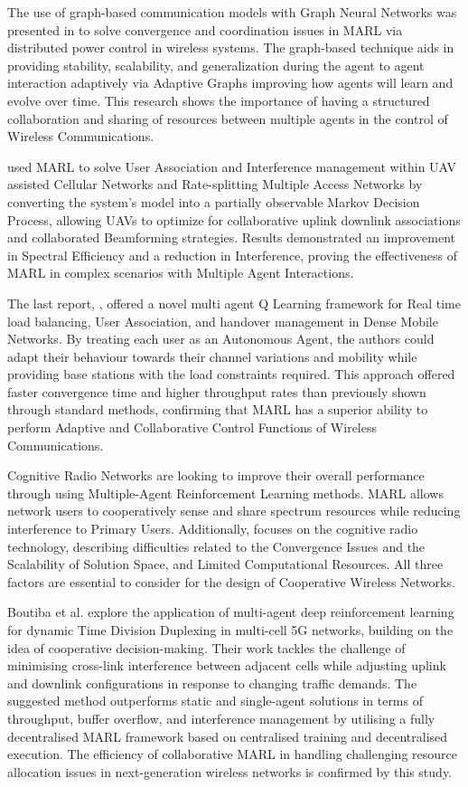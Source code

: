 \documentclass[a4paper,fleqn]{cas-dc}
\numberwithin{equation}{section}
\begin{document}
The use of graph-based communication models with Graph Neural Networks  was presented in \cite{amorosa2024multi} to solve convergence and coordination issues in MARL via distributed power control in wireless systems. The graph-based technique aids in providing stability, scalability, and generalization during the agent to agent interaction adaptively via Adaptive Graphs improving how agents will learn and evolve over time. This research shows the importance of having a structured collaboration and sharing of resources between multiple agents in the control of Wireless Communications.

\cite{ji2023decoupled} used MARL to solve User Association and Interference management within UAV assisted Cellular Networks and Rate-splitting Multiple Access Networks by converting the system's model into a partially observable Markov Decision Process, allowing UAVs to optimize for collaborative uplink downlink associations and collaborated Beamforming strategies. Results demonstrated an improvement in Spectral Efficiency and a reduction in Interference, proving the effectiveness of MARL in complex scenarios with Multiple Agent Interactions.

The last report, \cite{alizadeh2024multi}, offered a novel multi agent Q Learning framework for Real time load balancing, User Association, and handover management in Dense Mobile Networks. By treating each user as an Autonomous Agent, the authors could adapt their behaviour towards their channel variations and mobility while providing base stations with the load constraints required. This approach offered faster convergence time and higher throughput rates than previously shown through standard methods, confirming that MARL has a superior ability to perform Adaptive and Collaborative Control Functions of Wireless Communications.

Cognitive Radio Networks  are looking to improve their overall performance through using Multiple-Agent Reinforcement Learning  methods. MARL allows network users  to cooperatively sense and share spectrum resources while reducing interference to Primary Users. Additionally, \cite{rapetswa2023towards} focuses on the cognitive radio technology, describing difficulties related to the Convergence Issues and the Scalability of Solution Space, and Limited Computational Resources. All three factors are essential to consider for the design of Cooperative Wireless Networks.

Boutiba et al. \cite{boutiba2023multi} explore the application of multi-agent deep reinforcement learning for dynamic Time Division Duplexing  in multi-cell 5G networks, building on the idea of cooperative decision-making. Their work tackles the challenge of minimising cross-link interference between adjacent cells while adjusting uplink and downlink configurations in response to changing traffic demands. The suggested method outperforms static and single-agent solutions in terms of throughput, buffer overflow, and interference management by utilising a fully decentralised MARL framework based on centralised training and decentralised execution. The efficiency of collaborative MARL in handling challenging resource allocation issues in next-generation wireless networks is confirmed by this study.
\end{document}
